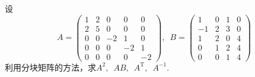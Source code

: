 \begin{example}{}{}
    设\[A=\begin{pmatrix}
            1 & 2 & 0  & 0  & 0  \\
            2 & 5 & 0  & 0  & 0  \\
            0 & 0 & -2 & 1  & 0  \\
            0 & 0 & 0  & -2 & 1  \\
            0 & 0 & 0  & 0  & -2
        \end{pmatrix},\enspace B=\begin{pmatrix}
            1  & 0 & 1 & 0 \\
            -1 & 2 & 3 & 0 \\
            1  & 2 & 0 & 4 \\
            0  & 1 & 2 & 4 \\
            0  & 0 & 1 & 4
        \end{pmatrix}\]
    利用分块矩阵的方法，求$A^2,\enspace AB,\enspace A^\mathrm{T},\enspace A^{-1}$.
\end{example}

